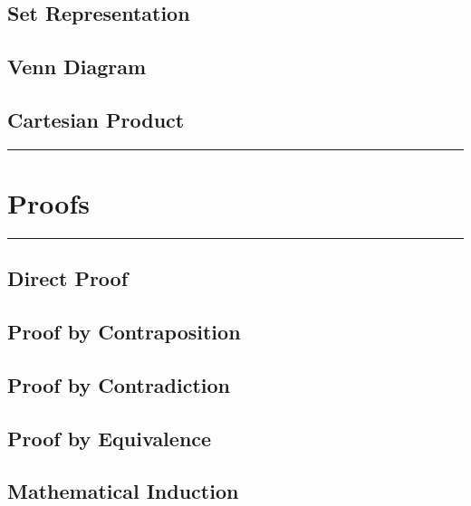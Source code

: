 \documentclass[]{book}
\begin{document}
\section{Set Representation}\label{set-representation}

\section{Venn Diagram}\label{venn-diagram}

\section{Cartesian Product}\label{cartesian-product}

\begin{center}\rule{0.5\linewidth}{\linethickness}\end{center}

\chapter{Proofs}\label{proofs}

\begin{center}\rule{0.5\linewidth}{\linethickness}\end{center}

\section{Direct Proof}\label{direct-proof}

\section{Proof by Contraposition}\label{proof-by-contraposition}

\section{Proof by Contradiction}\label{proof-by-contradiction}

\section{Proof by Equivalence}\label{proof-by-equivalence}

\section{Mathematical Induction}\label{mathematical-induction}
\end{document}
